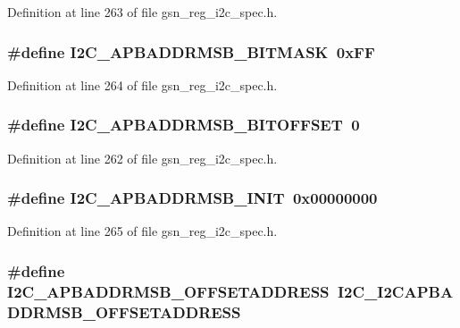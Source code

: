 Definition at line 263 of file gsn\_\-reg\_\-i2c\_\-spec.h.

\hypertarget{a00558_afcf3211df6cf01368db2a03999d90d26}{
\subsubsection[{I2C\_\-APBADDRMSB\_\-BITMASK}]{\setlength{\rightskip}{0pt plus 5cm}\#define I2C\_\-APBADDRMSB\_\-BITMASK~0xFF}}
\label{a00558_afcf3211df6cf01368db2a03999d90d26}


Definition at line 264 of file gsn\_\-reg\_\-i2c\_\-spec.h.

\hypertarget{a00558_a1f0f55d8d9e2506cc3837fd36485c96f}{
\subsubsection[{I2C\_\-APBADDRMSB\_\-BITOFFSET}]{\setlength{\rightskip}{0pt plus 5cm}\#define I2C\_\-APBADDRMSB\_\-BITOFFSET~0}}
\label{a00558_a1f0f55d8d9e2506cc3837fd36485c96f}


Definition at line 262 of file gsn\_\-reg\_\-i2c\_\-spec.h.

\hypertarget{a00558_ae0f0508ac02059e3b48eecbb622f059d}{
\subsubsection[{I2C\_\-APBADDRMSB\_\-INIT}]{\setlength{\rightskip}{0pt plus 5cm}\#define I2C\_\-APBADDRMSB\_\-INIT~0x00000000}}
\label{a00558_ae0f0508ac02059e3b48eecbb622f059d}


Definition at line 265 of file gsn\_\-reg\_\-i2c\_\-spec.h.

\hypertarget{a00558_aed5b730cb37ca4aa5e44da65e4d84583}{
\subsubsection[{I2C\_\-APBADDRMSB\_\-OFFSETADDRESS}]{\setlength{\rightskip}{0pt plus 5cm}\#define I2C\_\-APBADDRMSB\_\-OFFSETADDRESS~I2C\_\-I2CAPBADDRMSB\_\-OFFSETADDRESS}}
\label{a00558_aed5b730cb37ca4aa5e44da65e4d84583}


